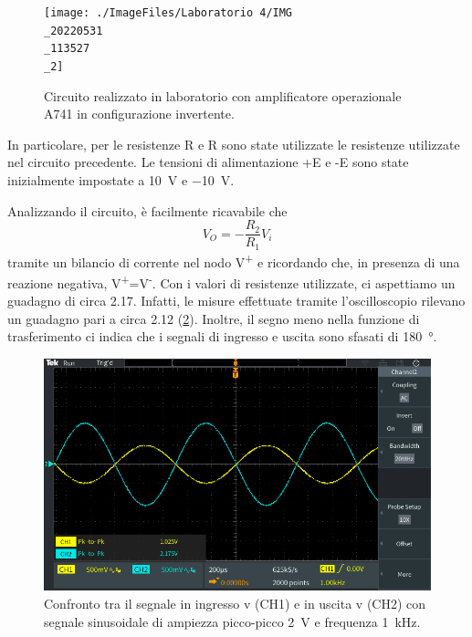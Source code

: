 \begin{figure}[h!]
	\centering
	\texttt{[image: ./ImageFiles/Laboratorio 4/IMG\\\_20220531\\\_113527\\\_2]}
	\caption{Circuito realizzato in laboratorio con amplificatore operazionale \textmu A741 in configurazione invertente.}
	\label{fig:opamp_inv_circuito}
\end{figure}

In particolare, per le resistenze R e R sono state utilizzate le resistenze utilizzate nel circuito precedente. Le tensioni di alimentazione +E e -E sono state inizialmente impostate a \SI{+10}{\volt} e \SI{-10}{\volt}.

Analizzando il circuito, è facilmente ricavabile che 
\begin{equation}
	V_O=-\frac{R_2}{R_1}V_i
\end{equation}
tramite un bilancio di corrente nel nodo V\textsuperscript{+} e ricordando che, in presenza di una reazione negativa, V\textsuperscript{+}=V\textsuperscript{-}. Con i valori di resistenze utilizzate, ci aspettiamo un guadagno di circa 2.17. Infatti, le misure effettuate tramite l'oscilloscopio rilevano un guadagno pari a circa 2.12 (\Fig\ref{fig:opamp_inv_amp}). Inoltre, il segno meno nella funzione di trasferimento ci indica che i segnali di ingresso e uscita sono sfasati di \SI{180}{\degree}.
\begin{figure}[h!]
	\centering
	\includegraphics[width=1\linewidth]{./ImageFiles/Laboratorio 4/TEK00005}
	\caption{Confronto tra il segnale in ingresso v (CH1)  e in uscita v (CH2) con segnale sinusoidale di ampiezza picco-picco \SI{2}{\volt} e frequenza \SI{1}{\kilo\hertz}.}
	\label{fig:opamp_inv_amp}
\end{figure}

